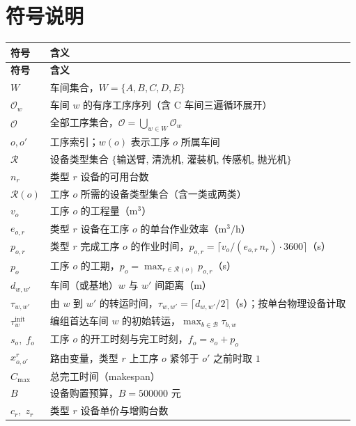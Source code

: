 \documentclass[12pt,a4paper]{ctexart}
\begin{document}
\section{符号说明}
\begin{longtable}{p{3.2cm} p{11.5cm}}
\toprule
\textbf{符号} & \textbf{含义} \\
\midrule
\endfirsthead
\toprule
\textbf{符号} & \textbf{含义} \\
\midrule
\endhead
\bottomrule
\endfoot
$W$ & 车间集合，$W=\{A,B,C,D,E\}$ \\
$\mathcal{O}_w$ & 车间 $w$ 的有序工序序列（含 C 车间三遍循环展开） \\
$\mathcal{O}$ & 全部工序集合，$\mathcal{O}=\bigcup_{w\in W}\mathcal{O}_w$ \\
$o,o'$ & 工序索引；$w(o)$ 表示工序 $o$ 所属车间 \\
$\mathcal{R}$ & 设备类型集合 $\{$输送臂, 清洗机, 灌装机, 传感机, 抛光机$\}$ \\
$n_r$ & 类型 $r$ 设备的可用台数 \\
$\mathcal{R}(o)$ & 工序 $o$ 所需的设备类型集合（含一类或两类） \\
$v_o$ & 工序 $o$ 的工程量（$\mathrm{m}^3$） \\
$e_{o,r}$ & 类型 $r$ 设备在工序 $o$ 的单台作业效率（$\mathrm{m}^3/\mathrm{h}$） \\
$p_{o,r}$ & 类型 $r$ 完成工序 $o$ 的作业时间，$p_{o,r}=\lceil v_o/(e_{o,r}\,n_r)\cdot 3600\rceil$（s） \\
$p_o$ & 工序 $o$ 的工期，$p_o=\max_{r\in\mathcal{R}(o)} p_{o,r}$（s） \\
$d_{w,w'}$ & 车间（或基地）$w$ 与 $w'$ 间距离（m） \\
$\tau_{w,w'}$ & 由 $w$ 到 $w'$ 的转运时间，$\tau_{w,w'}=\lceil d_{w,w'}/2\rceil$（s）；按单台物理设备计取 \\
$\tau^{\mathrm{init}}_{w}$ & 编组首达车间 $w$ 的初始转运，$\max_{b\in\mathcal{B}}\tau_{b,w}$ \\
$s_o,\;f_o$ & 工序 $o$ 的开工时刻与完工时刻，$f_o=s_o+p_o$ \\
$x^{r}_{o,o'}$ & 路由变量，类型 $r$ 上工序 $o$ 紧邻于 $o'$ 之前时取 $1$ \\
$C_{\max}$ & 总完工时间（makespan） \\
$B$ & 设备购置预算，$B=500000$ 元 \\
$c_r,\;z_r$ & 类型 $r$ 设备单价与增购台数 \\
\end{longtable}
\end{document}
